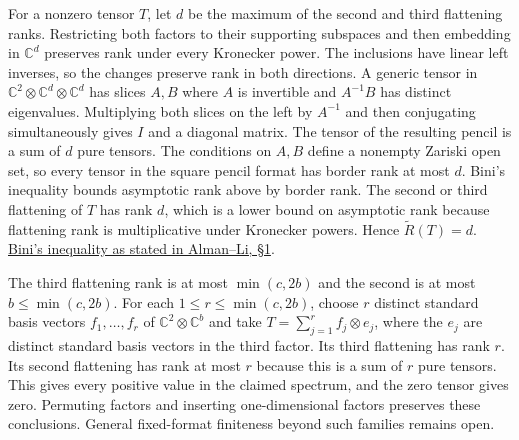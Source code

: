 \documentclass[11pt,a4paper]{article}
\begin{document}
For a nonzero tensor \(T\), let \(d\) be the maximum of the second and
third flattening ranks. Restricting both factors to their supporting
subspaces and then embedding in \(\mathbb C^d\) preserves rank under
every Kronecker power. The inclusions have linear left inverses, so the
changes preserve rank in both directions. A generic tensor in
\(\mathbb C^2\otimes \mathbb C^d\otimes\mathbb C^d\) has slices \(A,B\)
where \(A\) is invertible and \(A^{-1}B\) has distinct eigenvalues.
Multiplying both slices on the left by \(A^{-1}\) and then conjugating
simultaneously gives \(I\) and a diagonal matrix. The tensor of the
resulting pencil is a sum of \(d\) pure tensors. The conditions on
\(A,B\) define a nonempty Zariski open set, so every tensor in the
square pencil format has border rank at most \(d\). Bini's inequality
bounds asymptotic rank above by border rank. The second or third
flattening of \(T\) has rank \(d\), which is a lower bound on asymptotic
rank because flattening rank is multiplicative under Kronecker powers.
Hence \(\widetilde R(T)=d\).
\href{https://arxiv.org/html/2605.21738v1\#S1}{Bini's inequality as
stated in Alman--Li, §1}.

The third flattening rank is at most \(\min(c,2b)\) and the second is at
most \(b\le\min(c,2b)\). For each \(1\le r\le\min(c,2b)\), choose \(r\)
distinct standard basis vectors \(f_1,\ldots,f_r\) of
\(\mathbb C^2\otimes\mathbb C^b\) and take
\(T=\sum_{j=1}^r f_j\otimes e_j\), where the \(e_j\) are distinct
standard basis vectors in the third factor. Its third flattening has
rank \(r\). Its second flattening has rank at most \(r\) because this is
a sum of \(r\) pure tensors. This gives every positive value in the
claimed spectrum, and the zero tensor gives zero. Permuting factors and
inserting one-dimensional factors preserves these conclusions. General
fixed-format finiteness beyond such families remains open.
\end{document}
